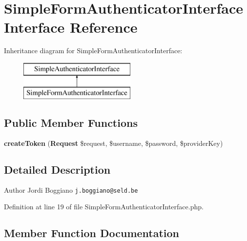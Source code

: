 \section{Simple\+Form\+Authenticator\+Interface Interface Reference}
\label{interface_symfony_1_1_component_1_1_security_1_1_core_1_1_authentication_1_1_simple_form_authenticator_interface}
Inheritance diagram for Simple\+Form\+Authenticator\+Interface\+:\begin{figure}[H]
\begin{center}
\leavevmode
\includegraphics[height=2.000000cm]{interface_symfony_1_1_component_1_1_security_1_1_core_1_1_authentication_1_1_simple_form_authenticator_interface}
\end{center}
\end{figure}
\subsection*{Public Member Functions}
\begin{DoxyCompactItemize}
\item 
{\bf create\+Token} ({\bf Request} \$request, \$username, \$password, \$provider\+Key)
\end{DoxyCompactItemize}


\subsection{Detailed Description}
\begin{DoxyAuthor}{Author}
Jordi Boggiano {\tt j.\+boggiano@seld.\+be} 
\end{DoxyAuthor}


Definition at line 19 of file Simple\+Form\+Authenticator\+Interface.\+php.



\subsection{Member Function Documentation}
